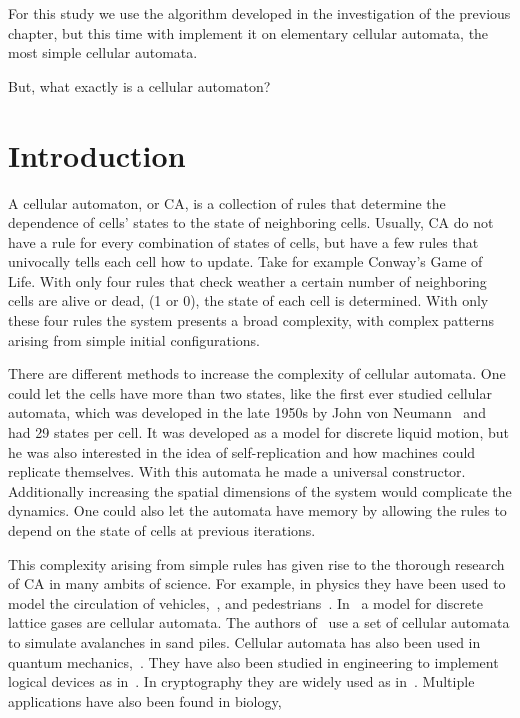 For this study we use the algorithm developed in the investigation of the previous chapter, but this time with implement it on elementary cellular automata, the most simple cellular automata.

But, what exactly is a cellular automaton?

\section{Introduction}


A cellular automaton, or CA, is a collection of rules that determine the dependence of cells' states to the state of neighboring cells.
Usually, CA do not have a rule for every combination of states of cells, but have a few rules that univocally tells each cell how to update. Take for example Conway's Game of Life. With only four rules that check weather a certain number of neighboring cells are alive or dead, (1 or 0), the state of each cell is determined. With only these four rules the system presents a broad complexity, with complex patterns arising from simple initial configurations. 


There are different methods to increase the complexity of cellular automata. One could let the cells have more than two states, like the first ever studied cellular automata, which was developed in the late 1950s by John von Neumann~\cite{VonNeummanCA} and had 29 states per cell. It was developed as a model for discrete liquid motion, but he was also interested in the idea of self-replication and how machines could replicate themselves. With this automata he made a universal constructor. Additionally increasing the spatial dimensions of the system would complicate the dynamics. One could also let the automata have memory by allowing the rules to depend on the state of cells at previous iterations.

This complexity arising from simple rules has given rise to the thorough research of CA in many ambits of science. For example, in physics they have been used to model the circulation of vehicles,~\cite{PhysicsCA1}, and pedestrians~\cite{PhysicsCA2}. In~\cite{PhysicsCA3} a model for discrete lattice gases are cellular automata. The authors of~\cite{PhysicsCA4} use a set of cellular automata to simulate avalanches in sand piles. Cellular automata has also been used in quantum mechanics,~\cite{PhysicsCA5}. They have also been studied in engineering to implement logical devices as in~\cite{EngineeringCA1}. In cryptography they are widely used as in~\cite{CryptographyCA1, CryptographyCA2Lya}. Multiple applications have also been found in biology,~\cite{BiologyCA1, BiologyCA2, BiologyCA3}


